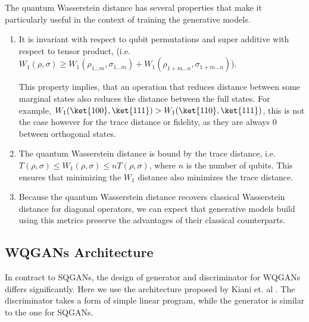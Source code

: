 The quantum Wasserstein distance has several properties that make it
particularly useful in the context of training the generative models.
\begin{enumerate}
\item It is invariant with respect to qubit permutations and super additive with
  respect to tensor product, (i.e. $W_1(\rho, \sigma) \geq W_1(\rho_{1 \ldots m},
  \sigma_{1 \ldots m}) + W_1(\rho_{1+m \ldots n},
  \sigma_{1+m \ldots n})$). 

  This property implies, that an operation that reduces distance between some
  marginal states also reduces the distance between the full states. For example,
  $W_1(\ket{100}, \ket{111}) > W_1(\ket{110}, \ket{111})$, this is not the case
  however for the trace distance or fidelity, as they are always $0$
  between orthogonal states. 
\item The quantum Wasserstein distance is bound by the trace distance, i.e.
  $T(\rho, \sigma) \leq W_1(\rho, \sigma) \leq nT(\rho, \sigma)$, where $n$ is
  the number of qubits. This ensures that minimizing the $W_1$ distance also
  minimizes the trace distance.
\item Because the quantum Wasserstein distance recovers classical Wasserstein
  distance for diagonal operators, we can expect that generative models build
  using this metrics preserve the advantages of their classical counterparts.
\end{enumerate}

\subsection{WQGANs Architecture}
In contract to SQGANs, the design of generator and discriminator for WQGANs
differs significantly. Here we use the architecture proposed by Kiani et. al
\cite{kiani2021quantum}. The discriminator takes a form of simple linear
program, while the generator is similar to the one for SQGANs.

